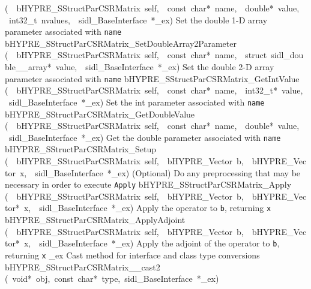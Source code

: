 \documentclass{article}
\begin{document}
\begin{cxxentry}
\begin{cxxentry}
\begin{cxxnames}
        {(\ \ bHYPRE\_SStructParCSRMatrix\ self,\ \ const\ char*\ name,\ \ double*\ value,\ \ int32\_t\ nvalues,\ \ sidl\_BaseInterface\ *\_ex)}
        {
Set the double 1-D array parameter associated with {\tt name}}
        {}
\label{cxx.4.7.27}
        {bHYPRE\_SStructParCSRMatrix\_SetDoubleArray2Parameter}
        {(\ \ bHYPRE\_SStructParCSRMatrix\ self,\ \ const\ char*\ name,\ \ struct\ sidl\_double\_\_array*\ value,\ \ sidl\_BaseInterface\ *\_ex)}
        {
Set the double 2-D array parameter associated with {\tt name}}
        {}
\label{cxx.4.7.28}
        {bHYPRE\_SStructParCSRMatrix\_GetIntValue}
        {(\ \ bHYPRE\_SStructParCSRMatrix\ self,\ \ const\ char*\ name,\ \ int32\_t*\ value,\ \ sidl\_BaseInterface\ *\_ex)}
        {
Set the int parameter associated with {\tt name}}
        {}
\label{cxx.4.7.29}
        {bHYPRE\_SStructParCSRMatrix\_GetDoubleValue}
        {(\ \ bHYPRE\_SStructParCSRMatrix\ self,\ \ const\ char*\ name,\ \ double*\ value,\ \ sidl\_BaseInterface\ *\_ex)}
        {
Get the double parameter associated with {\tt name}}
        {}
\label{cxx.4.7.30}
        {bHYPRE\_SStructParCSRMatrix\_Setup}
        {(\ \ bHYPRE\_SStructParCSRMatrix\ self,\ \ bHYPRE\_Vector\ b,\ \ bHYPRE\_Vector\ x,\ \ sidl\_BaseInterface\ *\_ex)}
        {
(Optional) Do any preprocessing that may be necessary in
order to execute {\tt Apply}}
        {}
\label{cxx.4.7.31}
        {bHYPRE\_SStructParCSRMatrix\_Apply}
        {(\ \ bHYPRE\_SStructParCSRMatrix\ self,\ \ bHYPRE\_Vector\ b,\ \ bHYPRE\_Vector*\ x,\ \ sidl\_BaseInterface\ *\_ex)}
        {
Apply the operator to {\tt b}, returning {\tt x}}
        {}
\label{cxx.4.7.32}
        {bHYPRE\_SStructParCSRMatrix\_ApplyAdjoint}
        {(\ \ bHYPRE\_SStructParCSRMatrix\ self,\ \ bHYPRE\_Vector\ b,\ \ bHYPRE\_Vector*\ x,\ \ sidl\_BaseInterface\ *\_ex)}
        {
Apply the adjoint of the operator to {\tt b}, returning {\tt x}}
        {}
\label{cxx.4.7.33}
        {\_ex}
        {}
        {
Cast method for interface and class type conversions}
        {}
\label{cxx.4.7.34}
        {bHYPRE\_SStructParCSRMatrix\_\_cast2}
        {(\ void*\ obj,\ const\ char*\ type,\ sidl\_BaseInterface\ *\_ex)}

\end{cxxnames}
\end{cxxentry}
\end{cxxentry}
\end{document}
